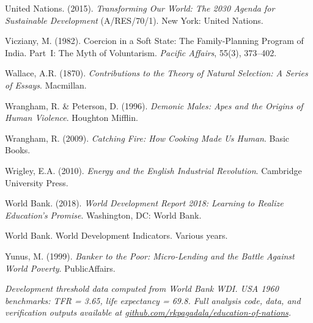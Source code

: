 \documentclass[12pt,letterpaper]{article}
\begin{document}
United Nations. (2015). \emph{Transforming Our World: The 2030 Agenda
for Sustainable Development} (A/RES/70/1). New York: United Nations.

Vicziany, M. (1982). Coercion in a Soft State: The Family-Planning
Program of India. Part~I: The Myth of Voluntarism. \emph{Pacific
Affairs}, 55(3), 373--402.

Wallace, A.R. (1870). \emph{Contributions to the Theory of Natural
Selection: A Series of Essays}. Macmillan.

Wrangham, R. \& Peterson, D. (1996). \emph{Demonic Males: Apes and
the Origins of Human Violence}. Houghton Mifflin.

Wrangham, R. (2009). \emph{Catching Fire: How Cooking Made Us Human}.
Basic Books.

Wrigley, E.A. (2010). \emph{Energy and the English Industrial
Revolution}. Cambridge University Press.

World Bank. (2018). \emph{World Development Report 2018: Learning to
Realize Education's Promise}. Washington, DC: World Bank.

World Bank. World Development Indicators. Various years.

Yunus, M. (1999). \emph{Banker to the Poor: Micro-Lending and the
Battle Against World Poverty}. PublicAffairs.


\emph{Development threshold data computed from World Bank WDI. USA 1960
benchmarks: TFR = 3.65, life expectancy = 69.8. Full analysis code,
data, and verification outputs available at
\href{https://github.com/rkpagadala/education-of-nations}{github.com/rkpagadala/education-of-nations}.}
\end{document}
